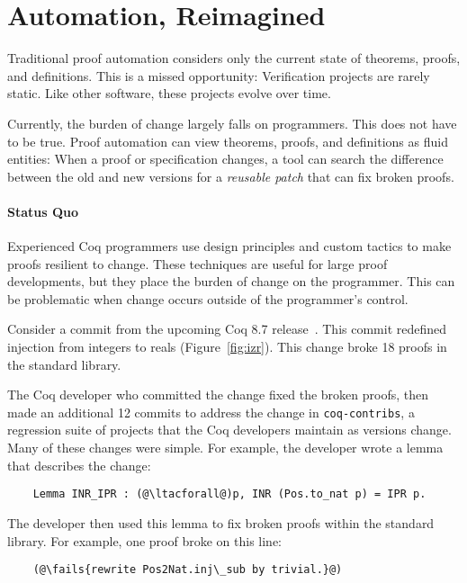 \section{Automation, Reimagined}

Traditional proof automation considers only the current state of
theorems, proofs, and definitions. This is a missed opportunity: Verification projects 
are rarely static. Like other software, these projects evolve over time.

Currently, the burden of change largely falls on programmers.
This does not have to be true. Proof automation
can view theorems, proofs, and definitions as fluid entities:
When a proof or specification changes,
a tool can search the difference between the old and new versions
for a \emph{reusable patch} that can fix broken proofs.

\paragraph{Status Quo} Experienced Coq programmers use design principles and custom tactics to make proofs
resilient to change. These techniques are useful for large proof developments, but they 
place the burden of change on the programmer. This can be problematic
when change occurs outside of the programmer's control. %

Consider a commit from the upcoming Coq 8.7 release~\cite{coq87commit}. 
This commit redefined injection from integers to reals (Figure~\ref{fig:izr}).
This change broke 18 proofs in the standard library. 

The Coq developer who committed the change fixed the broken proofs, then
made an additional 12 commits to address the change in \lstinline{coq-contribs},
a regression suite of projects that the Coq developers maintain as versions change.
Many of these changes were simple. For example, the developer wrote a lemma that describes the change:

\lstset{language=coq, aboveskip=3pt, belowskip=3pt}
\begin{lstlisting}
    Lemma INR_IPR : (@\ltacforall@)p, INR (Pos.to_nat p) = IPR p.
\end{lstlisting}

The developer then used this lemma to fix broken proofs within the standard library. 
For example, one proof broke on this line:

\begin{lstlisting}
    (@\fails{rewrite Pos2Nat.inj\_sub by trivial.}@)
\end{lstlisting}

